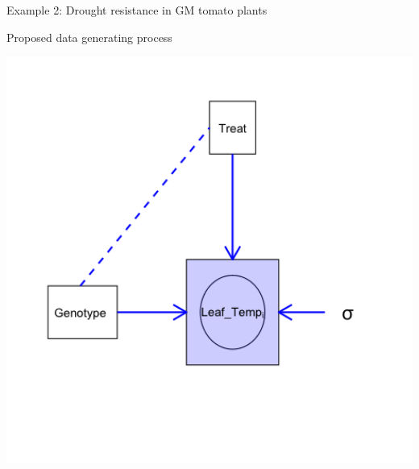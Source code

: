 \documentclass[
  12pt,
  ignorenonframetext,
  aspectratio=169,
]{beamer}
\begin{document}
\begin{frame}{Example 2: Drought resistance in GM tomato plants}
\protect\hypertarget{example-2-drought-resistance-in-gm-tomato-plants-1}{}

\begin{block}{Proposed data generating process}

\begin{center}\includegraphics[width=6.67in]{../images/Lecture3_drought} \end{center}

\end{block}

\end{frame}
\end{document}
